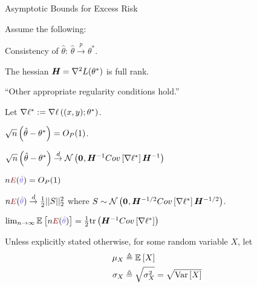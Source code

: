 \documentclass[11pt]{article}
\renewcommand\vec[2][]{\bm{#2}_{#1}}
\begin{document}
\begin{itemdefinition}{Asymptotic Bounds for Excess Risk}
	{Assume the following: \begin{compactitem}
			\item Consistency of $\hat{\theta}$: $\hat{\theta}  \overset{p}{\to} \theta^{*}$.
			\item The hessian $\bm{H}_{} = \nabla^{2}L(\theta^{*})$ is full rank. 
			\item ``Other appropriate regularity conditions hold.''
	\end{compactitem}
	Let $\nabla \ell^* := \nabla \ell\left(  (x, y); \theta^*  \right)$.}
	
	\item $\sqrt{n}\left(  \hat\theta - \theta^* \right) = O_P(1)$.
	
	\item $\sqrt{n} \lr{ \hat\theta - \theta^*}  \overset{d}{\to} \Gauss{\vec 0,   \minv{H} Cov\left[  \nabla \ell^* \right]   \minv{H}    }$ 
	
	\item $n  \mred{E}(\mblue{\hat \theta})  = O_P(1)$
	
	\item $n \mred{E}(\mblue{\hat \theta}) \overset{d}{\to} \onehalf ||S||_2^2$ where $S \sim \Gauss{\vec 0,   \matr{H}^{-1/2} Cov\left[  \nabla \ell^* \right]   \matr{H}^{-1/2}    }$. 
	
	\item $\lim_{n \to \infty} \E{   n \mred{E}(\mblue{\hat \theta}) } = \onehalf \text{tr}\lr{   \minv{H} Cov\left[  \nabla \ell^* \right]  }$
\end{itemdefinition}



























Unless explicitly stated otherwise, for some random variable $X$, let 
\begin{align}
	\mu_X &\triangleq \mathbb{E}_{}\left[X\right] \\
	\sigma_X &\triangleq \sqrt{\sigma^2_X} = \sqrt{\mathrm{Var}\left[X\right]}
\end{align}
\end{document}
